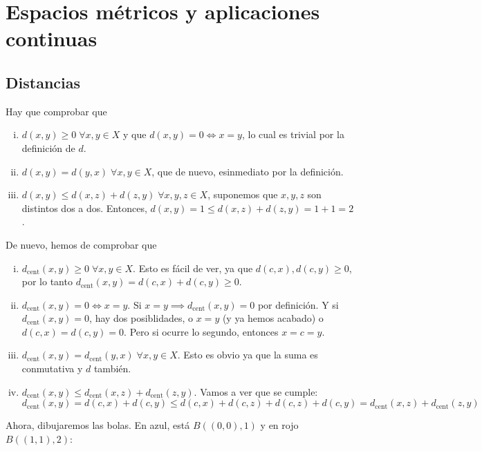 \chapter{Espacios m\'etricos y aplicaciones continuas}
\section{Distancias}

\begin{ej}
	Hay que comprobar que
	\begin{enumerate}[i)]
		\item $ d(x,y) \geq 0 \; \forall x,y \in X $ y que $ d(x,y) = 0 \iff x = y $, lo cual es trivial por la definición de $ d $.
		\item $ d(x,y) = d(y,x) \; \forall x, y \in X $, que de nuevo, esinmediato por la definición.
		\item $ d(x,y) \leq d(x,z) + d(z,y) \; \forall x, y, z \in X $, suponemos que $ x, y, z $ son distintos dos a dos. Entonces,
			$ d(x,y) = 1 \leq d(x, z) + d(z, y) = 1 + 1 = 2 $.
	\end{enumerate}
\end{ej}

\begin{ej}
	De nuevo, hemos de comprobar que
	\begin{enumerate}[i)]
		\item $d_{\text{cent}}(x, y) \geq 0 \; \forall x, y \in X$. Esto es fácil de ver, ya que $d(c, x), d(c,y) \geq 0$, por lo tanto
			$d_{\text{cent}}(x,y) = d(c,x) + d(c,y) \geq 0$.
		\item $d_{\text{cent}}(x, y) = 0 \iff x = y$. Si $x = y \implies d_{\text{cent}}(x,y) = 0$ por definición. Y si $d_{\text{cent}}(x,y) = 0$,
			hay dos posiblidades, o $x = y$ (y ya hemos acabado) o $d(c, x) = d(c,y) = 0$. Pero si ocurre lo segundo, entonces $x = c = y$.
		\item $d_{\text{cent}}(x, y) = d_{\text{cent}}(y, x) \; \forall x, y \in X$. Esto es obvio ya que la suma es conmutativa y $d$ tambi\'en.
		\item $d_{\text{cent}}(x,y) \leq d_{\text{cent}}(x, z) + d_{\text{cent}}(z, y)$. Vamos a ver que se cumple:
			\[
				d_{\text{cent}}(x, y) = d(c,x) + d(c,y) \leq d(c,x) + d(c,z) + d(c,z) + d(c,y) =
				d_{\text{cent}}(x, z) + d_{\text{cent}}(z,y)
			\]
	\end{enumerate}
	Ahora, dibujaremos las bolas. En azul, está $B\left( (0,0), 1 \right)$ y en rojo $B\left( (1,1), 2 \right)$:
	\begin{center}
		
	\end{center}
\end{ej}

